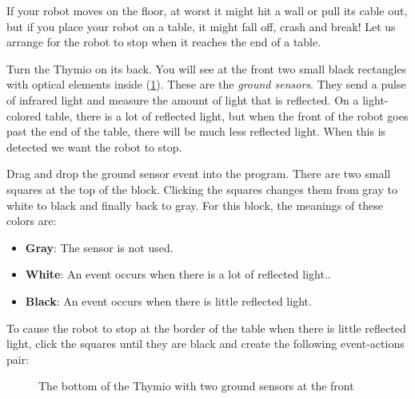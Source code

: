 If your robot moves on the floor, at worst it might hit a wall or pull
its cable out, but if you place your robot on a table, it might fall
off, crash and break! Let us arrange for the robot to stop when it
reaches the end of a table.


Turn the Thymio on its back. You will see at the front two small black
rectangles with optical elements inside (\cref{fig.bottom}). These are
the \emph{ground sensors}. They send a pulse of infrared light and
measure the amount of light that is reflected. On a light-colored table,
there is a lot of reflected light, but when the front of the robot goes
past the end of the table, there will be much less reflected light. When
this is detected we want the robot to stop.


Drag and drop the ground sensor event  into the
program. There are two small squares at the top of the block. Clicking
the squares changes them from gray to white to black and finally back to
gray. For this block, the meanings of these colors are:

\begin{itemize}
\item \textbf{Gray}: The sensor is not used.
\item \textbf{White}: An event occurs when there is a lot of reflected
light.\label{p.proximity-colors1}.
\item \textbf{Black}: An event occurs when there is little reflected light.
\end{itemize}


To cause the robot to stop at the border of the table when there is
little reflected light, click the squares until they are black and
create the following event-actions pair: 

\begin{figure}
\begin{center}
\caption{The bottom of the Thymio with two ground sensors at the front}\label{fig.bottom}
\end{center}
\end{figure}

